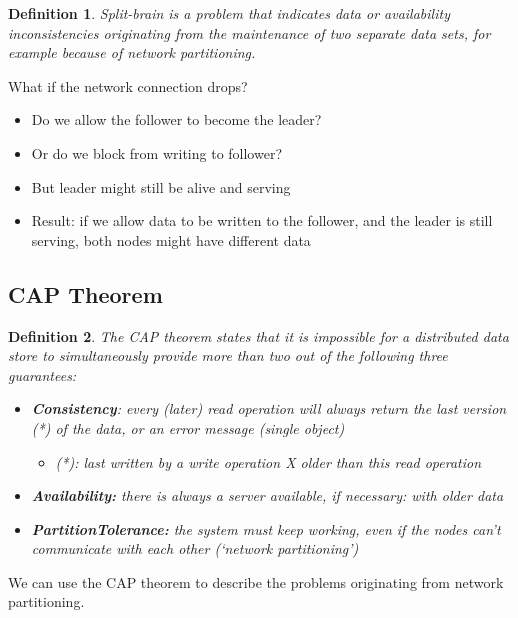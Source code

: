 \documentclass{article}
\newtheorem{theorem}{Definition}[section]
\begin{document}
\begin{theorem}
    Split-brain is a problem that indicates data or availability inconsistencies
    originating from the maintenance of two separate data sets, for example because
    of network partitioning.
\end{theorem}

What if the network connection drops?

\begin{itemize}
    \item Do we allow the follower to become the leader?
    \item Or do we block from writing to follower?
    \item But leader might still be alive and serving
    \item Result: if we allow data to be written to the follower, and the leader is still serving, both nodes might have different data
\end{itemize}

\subsection{CAP Theorem}

\begin{theorem}
    The CAP theorem states that it is impossible for a distributed data store to 
    simultaneously provide more than two out of the following three guarantees: 

\begin{itemize}
    \item \textbf{Consistency}: every (later) read operation will always return the last version (*) of the data, or an error message (single object)
    \begin{itemize}
        \item (*): last written by a write operation X older than this read operation
    \end{itemize}
    \item \textbf{Availability:} there is always a server available, if necessary: with older data
    \item \textbf{PartitionTolerance:} the system must keep working, even if the nodes can't communicate with each other (`network partitioning')
\end{itemize}
\end{theorem}

We can use the CAP theorem to describe the problems originating from network partitioning.
\end{document}
